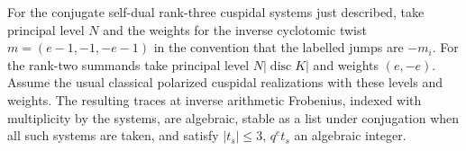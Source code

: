 

\begin{lemma}\label{rk3:purity}
For the conjugate self-dual rank-three cuspidal systems just described,
take principal level \(N\) and the weights for the inverse cyclotomic
twist \(m=(e-1,-1,-e-1)\) in the convention that the labelled jumps
are \(-m_i\). For the rank-two summands take principal level
\(N|\operatorname{disc}K|\) and weights \((e,-e)\). Assume the usual
classical polarized cuspidal realizations with these levels and weights.
The resulting traces at inverse arithmetic Frobenius, indexed with
multiplicity by the systems, are algebraic, stable as a list under
conjugation when all such systems are taken, and satisfy
\(|t_s|\le3\), \(q^et_s\) an algebraic integer.
\end{lemma}
